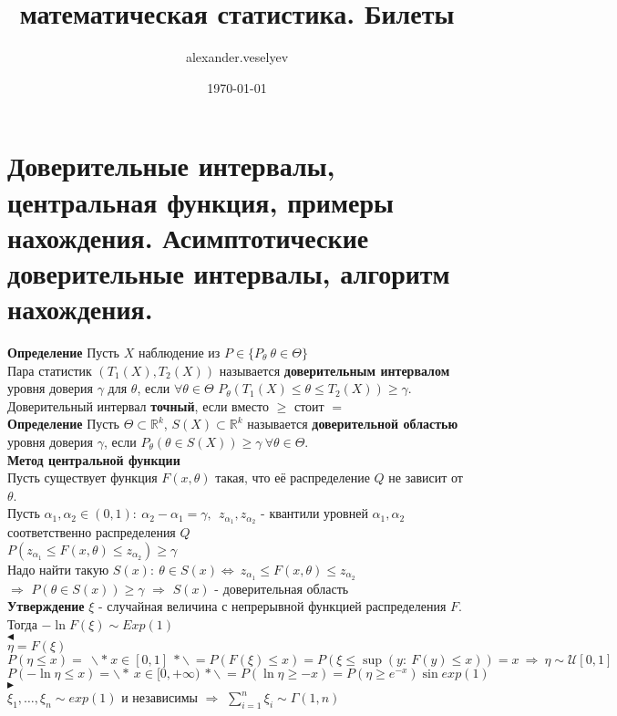 \documentclass{article}
\title{математическая статистика. Билеты}
\author{alexander.veselyev }
\date{\today}
\begin{document}
\section{Доверительные интервалы, центральная функция, примеры нахождения. Асимптотические доверительные интервалы, алгоритм нахождения.}
\textbf{Определение} 
Пусть $X$ наблюдение из $P\in\{P_\theta\ \theta\in\Theta\}$\\
Пара статистик $(T_1(X),T_2(X))$ называется \textbf{доверительным интервалом} уровня доверия $\gamma$ для $\theta$, если $\forall\theta\in\Theta$ $P_\theta(T_1(X)\leq\theta\leq T_2(X))\geq\gamma$.\\
Доверительный интервал \textbf{точный}, если вместо $\geq$ стоит $=$\\
\textbf{Определение}
Пусть $\Theta\subset\mathbb{R}^k$, $S(X)\subset\mathbb{R}^k$ называется \textbf{доверительной областью} уровня доверия $\gamma$, если $P_\theta(\theta\in S(X))\geq\gamma\ \forall\theta\in\Theta$.
\\
\textbf{Метод центральной функции}\\
Пусть существует функция $F(x,\theta)$ такая, что её распределение $Q$ не зависит от $\theta$.\\
Пусть $\alpha_1, \alpha_2 \in (0,1):\ \alpha_2 - \alpha_1 = \gamma,\ \ z_{\alpha_1}, z_{\alpha_2}$ - квантили уровней $\alpha_1, \alpha_2$ соответственно распределения $Q$\\
$P(z_{\alpha_1}\leq F(x,\theta)\leq z_{\alpha_2})\geq\gamma$\\
Надо найти такую $S(x):\ \theta\in S(x)\Leftrightarrow\ z_{\alpha_1}\leq F(x,\theta)\leq z_{\alpha_2}$\\
$\Rightarrow$ $P(\theta\in S(x))\geq\gamma$ $\Rightarrow$ $S(x)$ - доверительная область\\
\textbf{Утверждение} $\xi$ - случайная величина с непрерывной функцией распределения $F$.
Тогда $-\ln{F(\xi)}\sim Exp(1)$\\
$\blacktriangleleft$
\\
$\eta = F(\xi)$\\
$P(\eta\leq x) =\ \backslash* \ x\in[0,1]\ *\backslash \ = P(F(\xi)\leq x) = P(\xi \leq \sup(y:\ F(y)\leq x)) = x\ \Rightarrow\ \eta\sim\mathcal{U}[0,1]$\\
$P(-\ln{\eta}\leq x) = \backslash* \ x\in[0,+\infty)\ *\backslash \ = P(\ln{\eta}\geq -x) = P(\eta\geq e^{-x})\sin exp(1)$\\
$\blacktriangleright$\\
$\xi_1,\dots,\xi_n\sim exp(1)$ и независимы $\Rightarrow$ $\sum_{i=1}^n{\xi_i}\sim\Gamma(1,n)$\\
\end{document}
